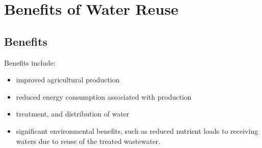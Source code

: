 \section{Benefits of Water Reuse}
\subsection{Benefits}
Benefits include:
\begin{itemize}
\item improved agricultural production
\item reduced energy consumption associated with production
\item treatment, and distribution of water
\item significant environmental benefits, such as reduced nutrient loads to receiving waters due to reuse of the treated wastewater.
\end{itemize}

